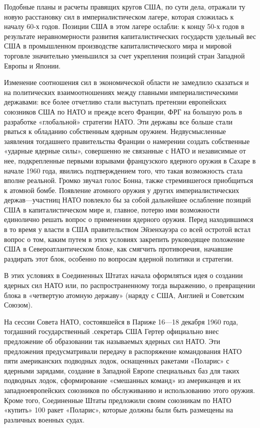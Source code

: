 \documentclass[12pt, a4paper, openany]{book}
\begin{document}
	Подобные планы и расчеты правящих кругов США, по сути дела, отражали ту новую расстановку сил в империалистическом лагере, которая сложилась к началу 60-х годов. Позиции США в этом лагере ослабли: к концу 50-х годов в результате неравномерности развития капиталистических государств удельный вес США в промышленном производстве капиталистического мира и мировой торговле значительно уменьшился за счет укрепления позиций стран Западной Европы и Японии.
	
	Изменение соотношения сил в экономической области не замедлило сказаться и на политических взаимоотношениях между главными империалистическими державами: все более отчетливо стали выступать претензии европейских союзников США по НАТО и прежде всего Франции, ФРГ на большую роль в разработке «глобальной» стратегии НАТО. Эти державы все больше стали рваться к обладанию собственным ядерным оружием. Недвусмысленные заявления тогдашнего правительства Франции о намерении создать собственные «ударные ядерные силы», совершенно не связанные с НАТО и независимые от нее, подкрепленные первыми взрывами французского ядерного оружия в Сахаре в начале 1960 года, явились подтверждением того, что такая возможность стала вполне реальной. Громко звучал голос Бонна, также стремившегося приобщиться к атомной бомбе. Появление атомного оружия у других империалистических держав—участниц НАТО повлекло бы за собой дальнейшее ослабление позиций США в капиталистическом мире и, главное, потерю ими возможности единолично решать вопрос о применении ядерного оружия. Перед находившимся в то время у власти в США правительством Эйзенхауэра со всей остротой встал вопрос о том, каким путем в этих условиях закрепить руководящее положение США в Североатлантическом блоке, как смягчить противоречия, начавшие раздирать этот блок, особенно по вопросам ядерной политики и стратегии.
	
	
	
	В этих условиях в Соединенных Штатах начала оформляться идея о создании ядерных сил НАТО или, по распространенному тогда выражению, о превращении блока в «четвертую атомную державу» (наряду с США, Англией и Советским Союзом).
	
	На сессии Совета НАТО, состоявшейся в Париже 16—18 декабря 1960 года, тогдашний государственный .секретарь США Гертер официально внес предложение об образовании так называемых ядерных сил НАТО. Эти предложения предусматривали передачу в распоряжение командования НАТО пяти американских подводных лодок, оснащенных ракетами «Поларис» с ядерными зарядами, создание в Западной Европе специальных баз для таких подводных лодок, сформирование «смешанных команд» из американцев и их западноевропейских союзников по обслуживанию и использованию этого оружия. Кроме того, Соединенные Штаты предложили своим союзникам по НАТО «купить» 100 ракет «Поларис», которые должны были быть размещены на различных военных судах.
	
\end{document}

